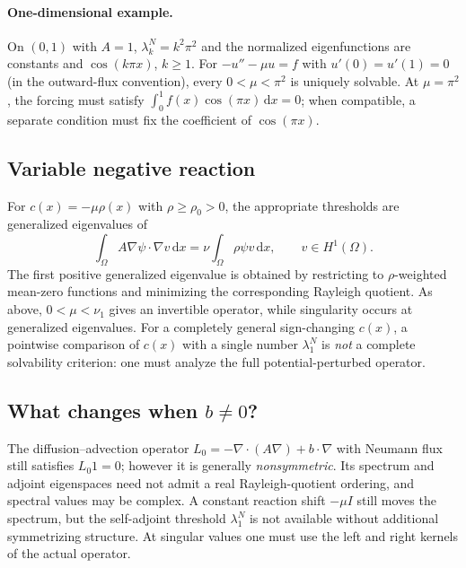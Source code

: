 \documentclass[11pt,letterpaper]{article}
\newcommand{\Om}{\Omega}
\newcommand{\dd}{\,\mathrm d}
\newcommand{\HH}{H^1(\Om)}
\begin{document}
\paragraph{One-dimensional example.}
On $(0,1)$ with $A=1$,
$\lambda_k^N=k^2\pi^2$ and the normalized eigenfunctions are constants and
$\cos(k\pi x)$, $k\ge1$. For
$-u''-\mu u=f$ with $u'(0)=u'(1)=0$ (in the outward-flux convention), every
$0<\mu<\pi^2$ is uniquely solvable. At $\mu=\pi^2$, the forcing must satisfy
$\int_0^1 f(x)\cos(\pi x)\dd x=0$; when compatible, a separate condition
must fix the coefficient of $\cos(\pi x)$.

\subsection{Variable negative reaction}
For $c(x)=-\mu\rho(x)$ with $\rho\ge\rho_0>0$, the appropriate thresholds
are generalized eigenvalues of
\begin{equation}\label{eq:generalizedeigen}
 \int_\Om A\nabla\psi\cdot\nabla v\dd x
 =\nu\int_\Om\rho\psi v\dd x,
 \qquad v\in\HH.
\end{equation}
The first positive generalized eigenvalue is obtained by restricting to
$\rho$-weighted mean-zero functions and minimizing the corresponding
Rayleigh quotient. As above, $0<\mu<\nu_1$ gives an invertible operator,
while singularity occurs at generalized eigenvalues. For a completely general
sign-changing $c(x)$, a pointwise comparison of $c(x)$ with a single number
$\lambda_1^N$ is \emph{not} a complete solvability criterion: one must analyze
the full potential-perturbed operator.

\subsection{What changes when $b\ne0$?}
The diffusion--advection operator
$L_0=-\nabla\cdot(A\nabla)+b\cdot\nabla$ with Neumann flux still satisfies
$L_0 1=0$; however it is generally \emph{nonsymmetric}. Its spectrum and
adjoint eigenspaces need not admit a real Rayleigh-quotient ordering, and
spectral values may be complex. A constant reaction shift $-\mu I$ still
moves the spectrum, but the self-adjoint threshold $\lambda_1^N$ is not
available without additional symmetrizing structure. At singular values one
must use the left and right kernels of the actual operator.
\end{document}
